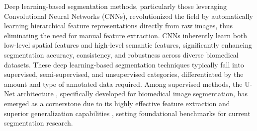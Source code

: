 \documentclass[./dissertation.tex]{subfiles}
\begin{document}
Deep learning-based segmentation methods, particularly those leveraging Convolutional Neural Networks (CNNs), revolutionized the field by automatically learning hierarchical feature representations directly from raw images, thus eliminating the need for manual feature extraction. CNNs inherently learn both low-level spatial features and high-level semantic features, significantly enhancing segmentation accuracy, consistency, and robustness across diverse biomedical datasets. These deep learning-based segmentation techniques typically fall into supervised, semi-supervised, and unsupervised categories, differentiated by the amount and type of annotated data required. Among supervised methods, the U-Net architecture \cite{ronneberger2015u}, specifically developed for biomedical image segmentation, has emerged as a cornerstone due to its highly effective feature extraction and superior generalization capabilities \cite{chen2021transunet}, setting foundational benchmarks for current segmentation research.
\end{document}
